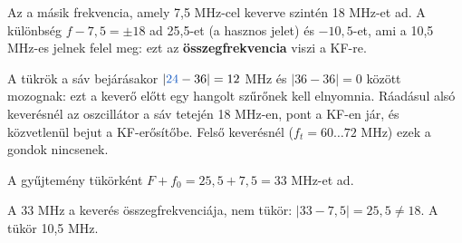 \begin{center}\end{center}



\begin{center}\end{center}

Az a másik frekvencia, amely 7,5 MHz-cel keverve szintén 18 MHz-et ad. A különbség $f-7{,}5=\pm18$ ad 25,5-et (a hasznos jelet) és $-10{,}5$-et, ami a 10,5 MHz-es jelnek felel meg: ezt az \textbf{összegfrekvencia} viszi a KF-re.

\begin{center}\end{center}

\begin{center}\end{center}

A tükrök a sáv bejárásakor $|{\ca{24}}-36|=12$ MHz és $|36-36|=0$ között mozognak: ezt a keverő előtt egy hangolt szűrőnek kell elnyomnia. Ráadásul alsó keverésnél az oszcillátor a sáv tetején 18 MHz-en, pont a KF-en jár, és közvetlenül bejut a KF-erősítőbe. Felső keverésnél ($f_t=60\ldots72$ MHz) ezek a gondok nincsenek.
\begin{tipp}
A gyűjtemény tükörként $F+f_0=25{,}5+7{,}5=33$ MHz-et ad.
\end{tipp}
\begin{figyelem}[Javítás]
A 33 MHz a keverés összegfrekvenciája, nem tükör: $|33-7{,}5|=25{,}5\ne18$. A tükör 10,5 MHz.
\end{figyelem}
\begin{eredmeny}

\begin{center}\end{center}
\end{eredmeny}


